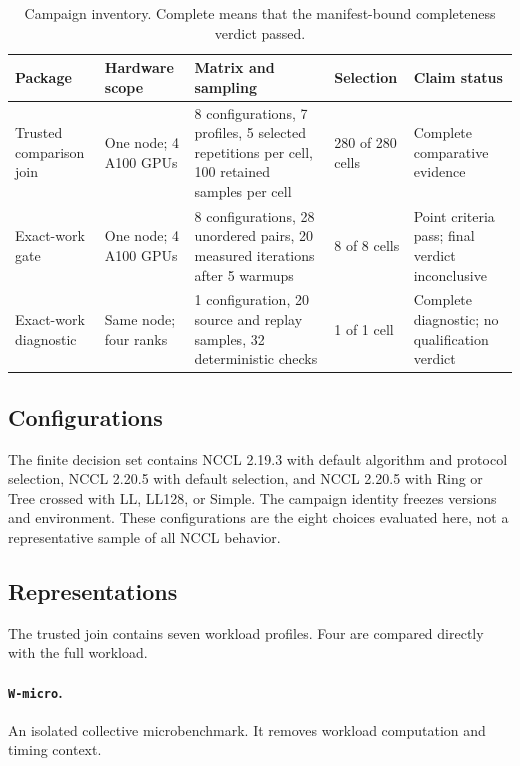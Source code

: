 \documentclass[10pt,twocolumn]{article}
\newcommand{\wname}[1]{\texttt{W-#1}}
\begin{document}
\begin{table}[t]
\caption{Campaign inventory. Complete means that the manifest-bound
completeness verdict passed.}
\label{tab:campaigns}
\centering\scriptsize
\begin{tabularx}{\textwidth}{@{}p{}p{}p{}p{}X@{}}
\toprule
Package & Hardware scope & Matrix and sampling & Selection & Claim status \\
\midrule
Trusted comparison join & One node; 4 A100 GPUs & 8 configurations, 7
profiles, 5 selected repetitions per cell, 100 retained samples per cell &
280 of 280 cells & Complete comparative evidence \\
Exact-work gate & One node; 4 A100 GPUs & 8 configurations, 28 unordered
pairs, 20 measured iterations after 5 warmups & 8 of 8 cells & Point criteria
pass; final verdict inconclusive \\
Exact-work diagnostic & Same node; four ranks & 1 configuration, 20 source and
replay samples, 32 deterministic checks & 1 of 1 cell & Complete diagnostic;
no qualification verdict \\
\bottomrule
\end{tabularx}
\end{table}

\subsection{Configurations}

The finite decision set contains NCCL 2.19.3 with default algorithm and
protocol selection, NCCL 2.20.5 with default selection, and NCCL 2.20.5 with
Ring or Tree crossed with LL, LL128, or Simple. The campaign identity freezes
versions and environment. These configurations are the eight choices evaluated
here, not a representative sample of all NCCL behavior.

\subsection{Representations}

The trusted join contains seven workload profiles. Four are compared directly
with the full workload.

\paragraph{\wname{micro}.} An isolated collective microbenchmark. It removes
workload computation and timing context.
\end{document}
